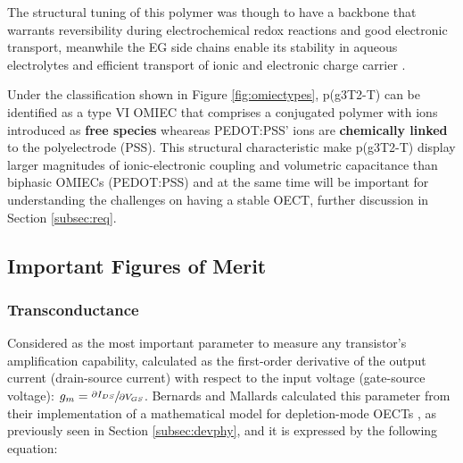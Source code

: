 The structural tuning of this polymer was though to have a backbone that warrants reversibility during electrochemical redox reactions and good electronic transport, meanwhile the EG side chains enable its stability in aqueous electrolytes and efficient transport of ionic and electronic charge carrier \cite{moiaDesignEvaluationConjugated2019}. 



Under the classification shown in Figure \ref{fig:omiectypes}, p(g3T2-T) can be identified as a type VI OMIEC that comprises a conjugated polymer with ions introduced as \textbf{free species} wheareas PEDOT:PSS' ions are \textbf{chemically linked} to the polyelectrode (PSS). This structural characteristic make p(g3T2-T) display larger magnitudes of ionic-electronic coupling and volumetric capacitance than biphasic OMIECs (PEDOT:PSS) \cite{paulsenOrganicMixedIonic2020} and at the same time will be important for understanding the challenges on having a stable OECT, further discussion in Section \ref{subsec:req}.


\subsection{Important Figures of Merit}

\subsubsection{Transconductance}
Considered as the most important parameter to measure any transistor's amplification capability, calculated as the first-order derivative of the output current (drain-source current) with respect to the input voltage (gate-source voltage): $g_{m} = \sfrac{\partial I_{DS}}{\partial V_{GS}}$. Bernards and Mallards calculated this parameter from their implementation of a mathematical model for depletion-mode OECTs \cite{bernardsSteadyStateTransientBehavior2007}, as previously seen in Section \ref{subsec:devphy}, and it is expressed by the following equation: %


